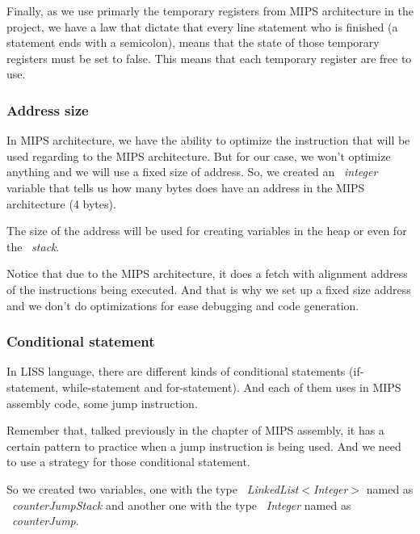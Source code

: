 \documentclass[
  oneside,
  11pt, a4paper,
  footinclude=true,
  headinclude=true,
  cleardoublepage=empty
]{scrbook}
\begin{document}
Finally, as we use primarly the temporary registers from MIPS architecture in the project, we have a law that dictate that every line statement who is finished (a statement ends with a semicolon), means that the state of those temporary registers must be set to false. This means that each temporary register are free to use.


\subsubsection{Address size}

In MIPS architecture, we have the ability to optimize the instruction that will be used regarding to the MIPS architecture.
But for our case, we won't optimize anything and we will use a fixed size of address.
So, we created an ~\textit{integer} variable that tells us how many bytes does have an address in the MIPS architecture (4  bytes). 

The size of the address will be used for creating variables in the heap or even for the ~\textit{stack}.

Notice that due to the MIPS architecture, it does a fetch with alignment address of the instructions being executed. And that is why we set up a fixed size address and we don't do optimizations for ease debugging and code generation.

\subsubsection{Conditional statement}

In LISS language, there are different kinds of conditional statements (if-statement, while-statement and for-statement).
And each of them uses in MIPS assembly code, some jump instruction.

Remember that, talked previously in the chapter of MIPS assembly, it has a certain pattern to practice when a jump instruction is being used.
And we need to use a strategy for those conditional statement.

So we created two variables, one with the type ~\textit{LinkedList$<$Integer$>$} named as ~\textit{counterJumpStack} and another one with the type ~\textit{Integer} named as ~\textit{counterJump}.
\end{document}
